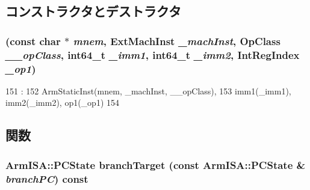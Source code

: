 \subsection{コンストラクタとデストラクタ}
\hypertarget{classArmISA_1_1BranchImmImmReg64_a86edd27123a15e844baec14f26bb7252}{
\subsubsection[{BranchImmImmReg64}]{ (const char $\ast$ {\em mnem}, \/  {\bf ExtMachInst} {\em \_\-machInst}, \/  OpClass {\em \_\-\_\-opClass}, \/  int64\_\-t {\em \_\-imm1}, \/  int64\_\-t {\em \_\-imm2}, \/  {\bf IntRegIndex} {\em \_\-op1})}}
\label{classArmISA_1_1BranchImmImmReg64_a86edd27123a15e844baec14f26bb7252}



\begin{DoxyCode}
151                                         :
152         ArmStaticInst(mnem, _machInst, __opClass),
153         imm1(_imm1), imm2(_imm2), op1(_op1)
154     {}

\end{DoxyCode}


\subsection{関数}
\hypertarget{classArmISA_1_1BranchImmImmReg64_aef1dd7539a8d8c49730120f2c0b8088e}{
\subsubsection[{branchTarget}]{\setlength{\rightskip}{0pt plus 5cm}ArmISA::PCState branchTarget (const ArmISA::PCState \& {\em branchPC}) const}}
\label{classArmISA_1_1BranchImmImmReg64_aef1dd7539a8d8c49730120f2c0b8088e}




